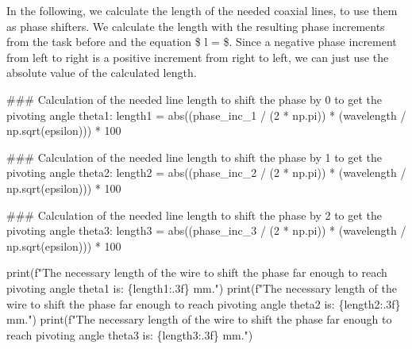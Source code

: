 \documentclass[
  letterpaper,
  DIV=11,
  numbers=noendperiod]{scrartcl}
\newenvironment{Shaded}{\begin{snugshade}}{\end{snugshade}}
\newcommand{\BuiltInTok}[1]{\textcolor[rgb]{0.00,0.23,0.31}{#1}}
\newcommand{\CommentTok}[1]{\textcolor[rgb]{0.37,0.37,0.37}{#1}}
\newcommand{\DecValTok}[1]{\textcolor[rgb]{0.68,0.00,0.00}{#1}}
\newcommand{\NormalTok}[1]{\textcolor[rgb]{0.00,0.23,0.31}{#1}}
\newcommand{\OperatorTok}[1]{\textcolor[rgb]{0.37,0.37,0.37}{#1}}
\newcommand{\SpecialCharTok}[1]{\textcolor[rgb]{0.37,0.37,0.37}{#1}}
\newcommand{\SpecialStringTok}[1]{\textcolor[rgb]{0.13,0.47,0.30}{#1}}
\begin{document}
In the following, we calculate the length of the needed coaxial lines,
to use them as phase shifters. We calculate the length with the
resulting phase increments from the task before and the equation \$ l =
\frac{\Delta \phi}{2 \pi}
\cdot {} \$. Since a negative
phase increment from left to right is a positive increment from right to
left, we can just use the absolute value of the calculated length.

\begin{Shaded}
\begin{Highlighting}[]
\CommentTok{\#\#\# Calculation of the needed line length to shift the phase by 0 to get the pivoting angle theta1: }
\NormalTok{length1 }\OperatorTok{=} \BuiltInTok{abs}\NormalTok{((phase\_inc\_1 }\OperatorTok{/}\NormalTok{ (}\DecValTok{2} \OperatorTok{*}\NormalTok{ np.pi)) }\OperatorTok{*}\NormalTok{ (wavelength }\OperatorTok{/}\NormalTok{ np.sqrt(epsilon))) }\OperatorTok{*} \DecValTok{100}

\CommentTok{\#\#\# Calculation of the needed line length to shift the phase by 1 to get the pivoting angle theta2: }
\NormalTok{length2 }\OperatorTok{=} \BuiltInTok{abs}\NormalTok{((phase\_inc\_2 }\OperatorTok{/}\NormalTok{ (}\DecValTok{2} \OperatorTok{*}\NormalTok{ np.pi)) }\OperatorTok{*}\NormalTok{ (wavelength }\OperatorTok{/}\NormalTok{ np.sqrt(epsilon))) }\OperatorTok{*} \DecValTok{100}

\CommentTok{\#\#\# Calculation of the needed line length to shift the phase by 2 to get the pivoting angle theta3: }
\NormalTok{length3 }\OperatorTok{=} \BuiltInTok{abs}\NormalTok{((phase\_inc\_3 }\OperatorTok{/}\NormalTok{ (}\DecValTok{2} \OperatorTok{*}\NormalTok{ np.pi)) }\OperatorTok{*}\NormalTok{ (wavelength }\OperatorTok{/}\NormalTok{ np.sqrt(epsilon))) }\OperatorTok{*} \DecValTok{100}

\BuiltInTok{print}\NormalTok{(}\SpecialStringTok{f"The necessary length of the wire to shift the phase far enough to reach pivoting angle theta1 is: }\SpecialCharTok{\{}\NormalTok{length1}\SpecialCharTok{:.3f\}}\SpecialStringTok{ mm."}\NormalTok{)}
\BuiltInTok{print}\NormalTok{(}\SpecialStringTok{f"The necessary length of the wire to shift the phase far enough to reach pivoting angle theta2 is: }\SpecialCharTok{\{}\NormalTok{length2}\SpecialCharTok{:.3f\}}\SpecialStringTok{ mm."}\NormalTok{)}
\BuiltInTok{print}\NormalTok{(}\SpecialStringTok{f"The necessary length of the wire to shift the phase far enough to reach pivoting angle theta3 is: }\SpecialCharTok{\{}\NormalTok{length3}\SpecialCharTok{:.3f\}}\SpecialStringTok{ mm."}\NormalTok{)}
\end{Highlighting}
\end{Shaded}
\end{document}
